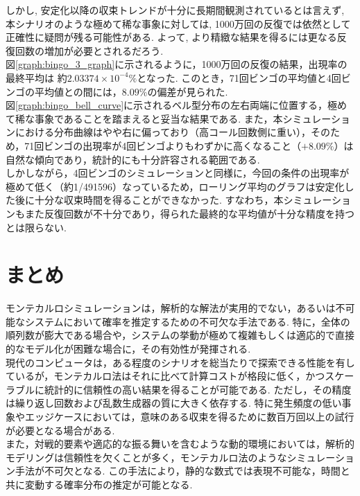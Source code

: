 \documentclass[a4j, 12pt ]{jarticle}
\begin{document}
しかし, 安定化以降の収束トレンドが十分に長期間観測されているとは言えず, 本シナリオのような極めて稀な事象に対しては, 1000万回の反復では依然として正確性に疑問が残る可能性がある. よって, より精緻な結果を得るには更なる反復回数の増加が必要とされるだろう.\\

図\ref{graph:bingo_3_graph}に示されるように，1000万回の反復の結果，出現率の最終平均は
約$2.03374 \times 10^{-4}\%$となった. このとき，71回ビンゴの平均値と4回ビンゴの平均値との間には，$8.09\%$の偏差が見られた. \\

図\ref{graph:bingo_bell_curve}に示されるベル型分布の左右両端に位置する，極めて稀な事象であることを踏まえると妥当な結果である. また，本シミュレーションにおける分布曲線はやや右に偏っており（高コール回数側に重い），そのため，71回ビンゴの出現率が4回ビンゴよりもわずかに高くなること（$+8.09\%$）は自然な傾向であり，統計的にも十分許容される範囲である.\\

しかしながら，4回ビンゴのシミュレーションと同様に，今回の条件の出現率が極めて低く（約1/491596）なっているため，ローリング平均のグラフは安定化した後に十分な収束時間を得ることができなかった. すなわち，本シミュレーションもまた反復回数が不十分であり，得られた最終的な平均値が十分な精度を持つとは限らない.\\

\section{まとめ}
モンテカルロシミュレーションは，解析的な解法が実用的でない，あるいは不可能なシステムにおいて確率を推定するための不可欠な手法である. 特に，全体の順列数が膨大である場合や，システムの挙動が極めて複雑もしくは適応的で直接的なモデル化が困難な場合に，その有効性が発揮される. \\

現代のコンピュータは，ある程度のシナリオを総当たりで探索できる性能を有しているが，モンテカルロ法はそれに比べて計算コストが格段に低く，かつスケーラブルに統計的に信頼性の高い結果を得ることが可能である. ただし，その精度は繰り返し回数および乱数生成器の質に大きく依存する. 特に発生頻度の低い事象やエッジケースにおいては，意味のある収束を得るために数百万回以上の試行が必要となる場合がある. \\

また，対戦的要素や適応的な振る舞いを含むような動的環境においては，解析的モデリングは信頼性を欠くことが多く，モンテカルロ法のようなシミュレーション手法が不可欠となる. この手法により，静的な数式では表現不可能な，時間と共に変動する確率分布の推定が可能となる. \\
\end{document}
